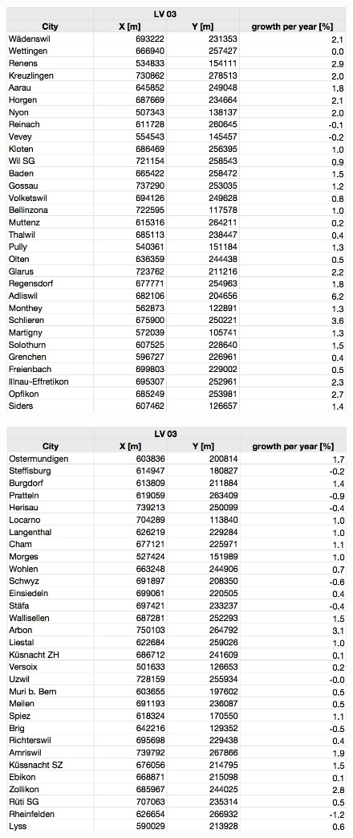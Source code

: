 \documentclass[11pt]{scrartcl}
\begin{document}
\begin{figure}[H]
	\centering
	\includegraphics[width=1.0\textwidth]{figures/city_list2}
\end{figure}

\begin{figure}[H]
	\centering
	\includegraphics[width=1.0\textwidth]{figures/city_list3}
\end{figure}
\end{document}

